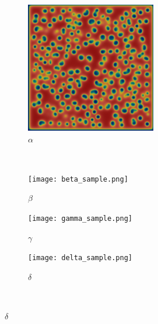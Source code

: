 \begin{figure}[h]
	\centering
	\begin{subfigure}[b]{0.2\textwidth}
                \includegraphics[width=\textwidth]{Figs/alpha_sample.png}
                \caption{$\alpha$}
                \label{fig:alpha_sample}
        \end{subfigure}%
        ~ %
        \begin{subfigure}[b]{0.2\textwidth}
                \texttt{[image: beta\_sample.png]}
                \caption{$\beta$}
                \label{fig:beta_sample}
        \end{subfigure}
        \begin{subfigure}[b]{0.2\textwidth}
                \texttt{[image: gamma\_sample.png]}
                \caption{$\gamma$}
                \label{fig:gamma_sample}
        \end{subfigure}
        \begin{subfigure}[b]{0.2\textwidth}
                \texttt{[image: delta\_sample.png]}
                \caption{$\delta$}
                \label{fig:delta_sample}
        \end{subfigure} \hfill \\

\end{figure}
